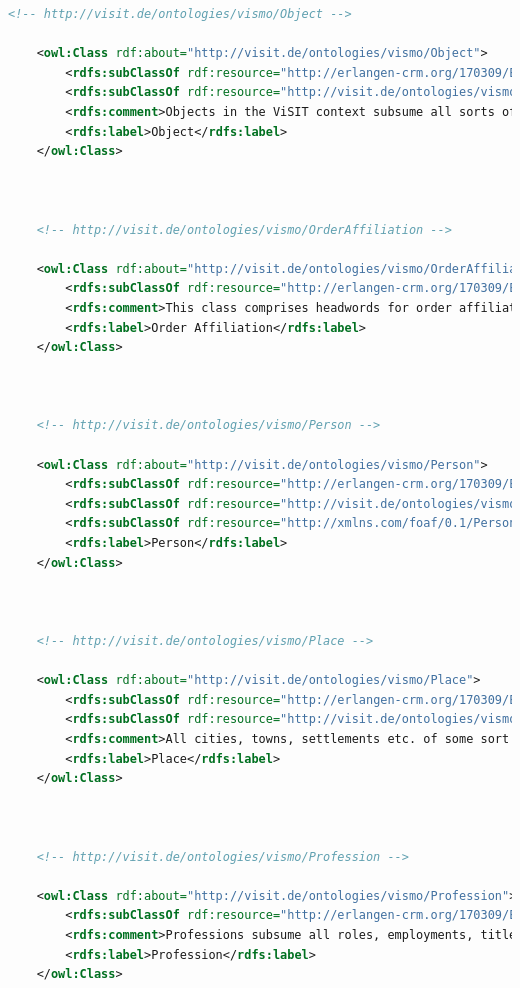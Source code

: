 \begin{lstlisting}[caption={VisMo Ontologie in der letzten (englischen) Version.},label={lst:vismo},captionpos=b,language=xml]
    <!-- http://visit.de/ontologies/vismo/Object -->

    <owl:Class rdf:about="http://visit.de/ontologies/vismo/Object">
        <rdfs:subClassOf rdf:resource="http://erlangen-crm.org/170309/E84_Information_Carrier"/>
        <rdfs:subClassOf rdf:resource="http://visit.de/ontologies/vismo/Resource"/>
        <rdfs:comment>Objects in the ViSIT context subsume all sorts of items that are displayed in a museum.</rdfs:comment>
        <rdfs:label>Object</rdfs:label>
    </owl:Class>
    


    <!-- http://visit.de/ontologies/vismo/OrderAffiliation -->

    <owl:Class rdf:about="http://visit.de/ontologies/vismo/OrderAffiliation">
        <rdfs:subClassOf rdf:resource="http://erlangen-crm.org/170309/E55_Type"/>
        <rdfs:comment>This class comprises headwords for order affiliations for vismo:Architecture resources.</rdfs:comment>
        <rdfs:label>Order Affiliation</rdfs:label>
    </owl:Class>
    


    <!-- http://visit.de/ontologies/vismo/Person -->

    <owl:Class rdf:about="http://visit.de/ontologies/vismo/Person">
        <rdfs:subClassOf rdf:resource="http://erlangen-crm.org/170309/E21_Person"/>
        <rdfs:subClassOf rdf:resource="http://visit.de/ontologies/vismo/Resource"/>
        <rdfs:subClassOf rdf:resource="http://xmlns.com/foaf/0.1/Person"/>
        <rdfs:label>Person</rdfs:label>
    </owl:Class>
    


    <!-- http://visit.de/ontologies/vismo/Place -->

    <owl:Class rdf:about="http://visit.de/ontologies/vismo/Place">
        <rdfs:subClassOf rdf:resource="http://erlangen-crm.org/170309/E53_Place"/>
        <rdfs:subClassOf rdf:resource="http://visit.de/ontologies/vismo/Resource"/>
        <rdfs:comment>All cities, towns, settlements etc. of some sort are subsumed under this class.</rdfs:comment>
        <rdfs:label>Place</rdfs:label>
    </owl:Class>
    


    <!-- http://visit.de/ontologies/vismo/Profession -->

    <owl:Class rdf:about="http://visit.de/ontologies/vismo/Profession">
        <rdfs:subClassOf rdf:resource="http://erlangen-crm.org/170309/E55_Type"/>
        <rdfs:comment>Professions subsume all roles, employments, titles, authorities, etc. for persons that are inherent in the cultural heritage domain.</rdfs:comment>
        <rdfs:label>Profession</rdfs:label>
    </owl:Class>
    



\end{lstlisting}
